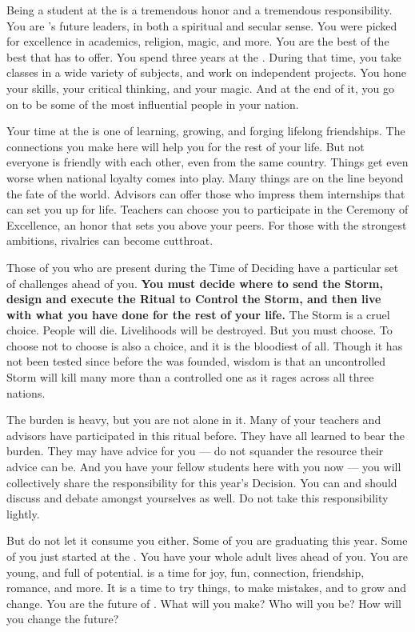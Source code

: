 \documentclass[blue]{GL2020}
\begin{document}
\name{\bStudentBlue{}}

Being a student at the \pSchool{} is a tremendous honor and a tremendous responsibility. You are \pEarth{}'s future leaders, in both a spiritual and secular sense. You were picked for excellence in academics, religion, magic, and more. You are the best of the best that \pEarth{} has to offer. You spend three years at the \pSchool{}. During that time, you take classes in a wide variety of subjects, and work on independent projects. You hone your skills, your critical thinking, and your magic. And at the end of it, you go on to be some of the most influential people in your nation.

Your time at the \pSc{} is one of learning, growing, and forging lifelong friendships. The connections you make here will help you for the rest of your life. But not everyone is friendly with each other, even from the same country. Things get even worse when national loyalty comes into play. Many things are on the line beyond the fate of the world. Advisors can offer those who impress them internships that can set you up for life. Teachers can choose you to participate in the Ceremony of Excellence, an honor that sets you above your peers. For those with the strongest ambitions, rivalries can become cutthroat.

Those of you who are present during the Time of Deciding have a particular set of challenges ahead of you. \textbf{You must decide where to send the Storm, design and execute the Ritual to Control the Storm, and then live with what you have done for the rest of your life.} The Storm is a cruel choice. People will die. Livelihoods will be destroyed. But you must choose. To choose not to choose is also a choice, and it is the bloodiest of all. Though it has not been tested since before the \pSc{} was founded, wisdom is that an uncontrolled Storm will kill many more than a controlled one as it rages across all three nations.

The burden is heavy, but you are not alone in it. Many of your teachers and advisors have participated in this ritual before. They have all learned to bear the burden. They may have advice for you — do not squander the resource their advice can be. And you have your fellow students here with you now — you will collectively share the responsibility for this year's Decision. You can and should discuss and debate amongst yourselves as well. Do not take this responsibility lightly.

But do not let it consume you either. Some of you are graduating this year. Some of you just started at the \pSchool{}. You have your whole adult lives ahead of you. You are young, and full of potential. \pSc{} is a time for joy, fun, connection, friendship, romance, and more. It is a time to try things, to make mistakes, and to grow and change. You are the future of \pEarth{}. What will you make? Who will you be? How will you change the future?
\end{document}
